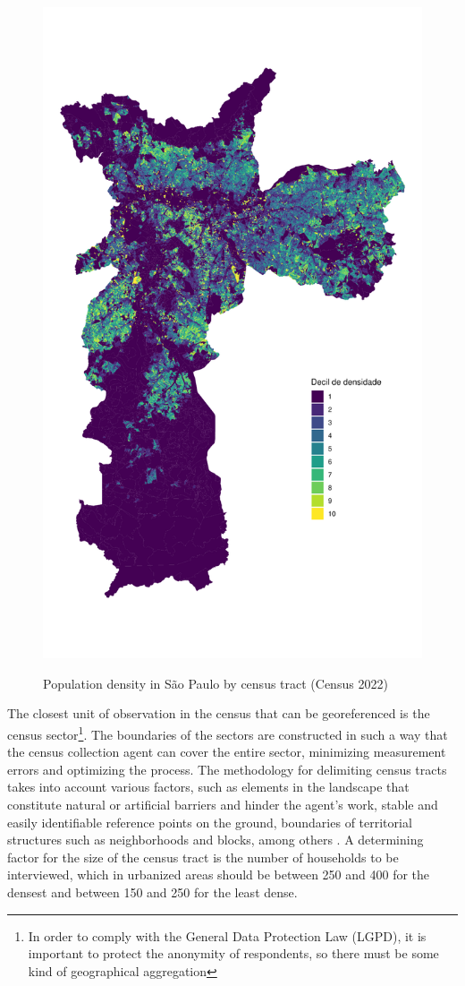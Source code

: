 \begin{figure}[!h]
    \centering
    \caption{Population density in São Paulo by census tract (Census 2022)}
    \includegraphics[width = .95\linewidth]{figuras/mapa-densidade.pdf}
    \label{fig:population}
\end{figure}

The closest unit of observation in the census that can be georeferenced is the census sector\footnote{In order to comply with the General Data Protection Law (LGPD), it is important to protect the anonymity of respondents, so there must be some kind of geographical aggregation}. The boundaries of the sectors are constructed in such a way that the census collection agent can cover the entire sector, minimizing measurement errors and optimizing the process. The methodology for delimiting census tracts takes into account various factors, such as elements in the landscape that constitute natural or artificial barriers and hinder the agent's work, stable and easily identifiable reference points on the ground, boundaries of territorial structures such as neighborhoods and blocks, among others \cite{IBGE2024}. A determining factor for the size of the census tract is the number of households to be interviewed, which in urbanized areas should be between 250 and 400 for the densest and between 150 and 250 for the least dense.

